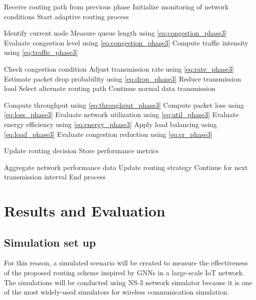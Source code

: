 \documentclass[a4paper,fleqn]{cas-dc}
\numberwithin{equation}{section}
\begin{document}
\begin{algorithm}[H]
\caption{Adaptive Routing and Congestion Control}
\label{alg:phase3}
\begin{algorithmic}

\STATE Receive routing path from previous phase
\STATE Initialize monitoring of network conditions
\STATE Start adaptive routing process


\STATE Identify current node
\STATE Measure queue length using \ref{eq:congestion_phase3}
\STATE Evaluate congestion level using \ref{eq:congestion_phase3}
\STATE Compute traffic intensity using \ref{eq:traffic_phase3}

\STATE Check congestion condition
\STATE Adjust transmission rate using \ref{eq:rate_phase3}
\STATE Estimate packet drop probability using \ref{eq:drop_phase3}
\STATE Reduce transmission load
\STATE Select alternate routing path
\ELSE
\STATE Continue normal data transmission
\ENDIF

\STATE Compute throughput using \ref{eq:throughput_phase3}
\STATE Compute packet loss using \ref{eq:loss_phase3}
\STATE Evaluate network utilization using \ref{eq:util_phase3}
\STATE Evaluate energy efficiency using \ref{eq:energy_phase3}
\STATE Apply load balancing using \ref{eq:load_phase3}
\STATE Evaluate congestion reduction using \ref{eq:cr_phase3}

\STATE Update routing decision
\STATE Store performance metrics

\ENDFOR

\STATE Aggregate network performance data
\STATE Update routing strategy
\STATE Continue for next transmission interval
\STATE End process

\end{algorithmic}
\end{algorithm}
\section{Results and Evaluation}
\subsection{Simulation set up}
For this reason, a simulated scenario will be created to measure the effectiveness of the proposed routing scheme inspired by GNNs in a large-scale IoT network. The simulations will be conducted using NS-3 network simulator because it is one of the most widely-used simulators for wireless communication simulation.
\end{document}
